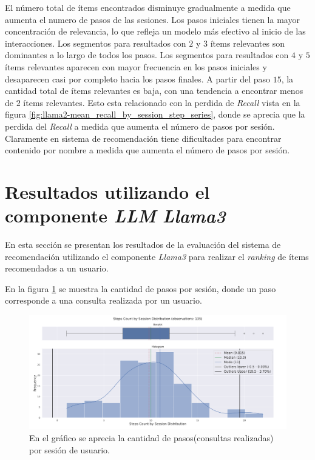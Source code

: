 \documentclass[11pt,a4paper,twoside]{thesis}
\begin{document}
El número total de ítems encontrados disminuye gradualmente a medida que aumenta el numero de pasos de las sesiones. Los pasos iniciales tienen la mayor concentración de relevancia, lo que refleja un modelo más efectivo al inicio de las interacciones. Los segmentos para resultados con $2$ y $3$ ítems relevantes son dominantes a lo largo de todos los pasos.
Los segmentos para resultados con $4$ y $5$ ítems relevantes aparecen con mayor frecuencia en los pasos iniciales y desaparecen casi por completo hacia los pasos finales. A partir del paso $15$, la cantidad total de ítems relevantes es baja, con una tendencia a encontrar menos de $2$ ítems relevantes. Esto esta relacionado con la perdida de \textit{Recall} vista en la figura \ref{fig:llama2-mean_recall_by_session_step_series}, donde se aprecia que la perdida del \textit{Recall} a medida que aumenta el número de pasos por sesión. Claramente en sistema de recomendación tiene dificultades para encontrar contenido por nombre a medida que aumenta el número de pasos por sesión.

\section{Resultados utilizando el componente \textit{LLM} \textit{Llama3}}

En esta sección se presentan los resultados de la evaluación del sistema de recomendación utilizando el componente \textit{Llama3} para realizar el \textit{ranking} de ítems recomendados a un usuario.

En la figura \ref{fig:llama3-steps_count_by_session_distribution} se muestra la cantidad de pasos por sesión, donde un paso corresponde a una consulta realizada por un usuario.

\begin{figure}[H]
	\centering
	\includegraphics[width=15cm]{./images/llama3/steps_count_by_session_distribution.png}
	\caption{En el gráfico se aprecia la cantidad de pasos(consultas realizadas) por sesión de usuario.}
	\label{fig:llama3-steps_count_by_session_distribution}
\end{figure}
\end{document}
